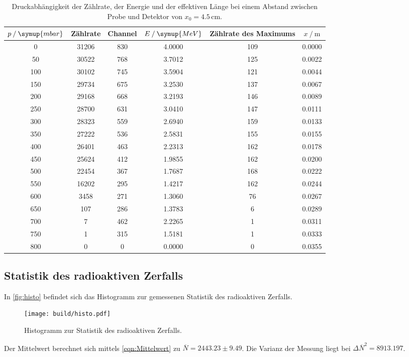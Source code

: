 \begin{table}
  \centering
  \caption{Druckabhängigkeit der Zählrate, der Energie und der effektiven Länge bei einem Abstand zwischen Probe und Detektor von $x_0 = 4.5\,\unit{\cm}$.}
\begin{tabular}{c c c c c c}
  \toprule
  $p \mathbin{/}\symup{mbar}$ &Zählrate& Channel & $E \mathbin{/}\symup{MeV}$ & Zählrate des Maximums & $x \mathbin{/}\unit{\m}$ \\
  \midrule
                    0&31206&830&4.0000&109&0.0000 \\
                    50&30522&768&3.7012&125&0.0022 \\
                   100&30102&745&3.5904&121&0.0044 \\
                   150&29734&675&3.2530&137&0.0067 \\
                   200&29168&668&3.2193&146&0.0089 \\
                   250&28700&631&3.0410&147&0.0111 \\
                   300&28323&559&2.6940&159&0.0133 \\
                   350&27222&536&2.5831&155&0.0155 \\
                   400&26401&463&2.2313&162&0.0178 \\
                   450&25624&412&1.9855&162&0.0200 \\
                   500&22454&367&1.7687&168&0.0222 \\
                   550&16202&295&1.4217&162&0.0244 \\
                     600&3458&271&1.3060&76&0.0267 \\
                       650&107&286&1.3783&6&0.0289 \\
                         700&7&462&2.2265&1&0.0311 \\
                         750&1&315&1.5181&1&0.0333 \\
                           800&0&0&0.0000&0&0.0355 \\
  \bottomrule
  \end{tabular}
  \label{tab:4.5cm}
\end{table}






\subsection{Statistik des radioaktiven Zerfalls}
In \autoref{fig:histo} befindet sich das Histogramm zur gemessenen Statistik des radioaktiven Zerfalls.

\begin{figure}
  \centering
  \texttt{[image: build/histo.pdf]}
  \caption{Histogramm zur Statistik des radioaktiven Zerfalls.}
  \label{fig:histo}
\end{figure}

Der Mittelwert berechnet sich mittels \autoref{eqn:Mittelwert} zu $\overline{N} = 2443.23 \pm 9.49$. Die Varianz
der Messung liegt bei ${\Delta\overline{N}}^2 = 8913.197$.